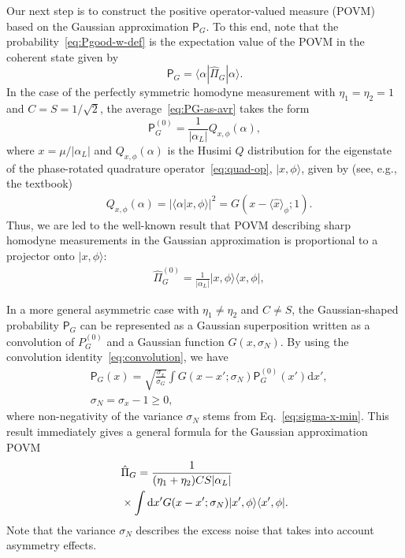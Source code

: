 \documentclass[%
reprint,
superscriptaddress,
 amsmath,amssymb,amsfonts,
 aps,
 pra,
 longbibliography
]{revtex4-2}
\newcommand{\ket}[1]{\ensuremath{|{#1}\rangle}}
\newcommand{\avr}[1]{\ensuremath{\langle{#1}\rangle}}
\newcommand{\prob}{\mathsf{P}}
\newcommand{\dd}{\mathrm{d}}
\begin{document}
Our next step is to construct
the positive operator-valued measure
(POVM) based on the Gaussian approximation $\prob_G$.
To this end, note that the probability~\eqref{eq:Pgood-w-def}
is the expectation value of the POVM in the coherent state
given by
\begin{equation}
  \label{eq:PG-as-avr}
    \prob_G=\langle\alpha|\hat{\Pi}_G|\alpha\rangle.
\end{equation}
In the case of
the perfectly symmetric homodyne measurement with
$\eta_1=\eta_2=1$ and $C=S=1/\sqrt{2}$,
the average~\eqref{eq:PG-as-avr}
takes the form
\begin{equation}
    \label{eq:P_0}
    \prob_G^{(0)}=
    \frac{1}{|\alpha_L|} Q_{x,\phi}(\alpha), 
  \end{equation}
  where
  $x=\mu/|\alpha_L|$
  and $Q_{x,\phi}(\alpha)$ is the Husimi $Q$ distribution
for the eigenstate of the phase-rotated quadrature
operator~\eqref{eq:quad-op},
$\ket{x,\phi}$, given by
(see, e.g., the textbook\cite{Vogel:bk:2006})
\begin{align}
  &
    \label{eq:Q-x}
  Q_{x,\phi}(\alpha)=
    |\langle \alpha|x , \phi \rangle |^2 =G(x-\avr{\hat{x}}_\phi;1).
\end{align}
Thus, we are led to the well-known result that POVM describing sharp homodyne measurements
in the Gaussian approximation is proportional to
a projector onto $|x,\phi\rangle$:
\begin{align}
  &
  \label{eq:POVM-P0}
    \hat{\Pi}_G^{(0)}=\frac{1}{|\alpha_L|}|x,\phi\rangle\langle x,\phi|,
\end{align}

In  a more general asymmetric case with $\eta_1\ne \eta_2$
and $C\ne S$,
the Gaussian-shaped probability $\prob_G$ can be represented
as a Gaussian superposition written as
a convolution of $P_{G}^{(0)}$ and a Gaussian function $G(x,\sigma_N)$.
By using the convolution identity~\eqref{eq:convolution},
we have
\begin{align}
  &
  \label{eq:theform}
  \prob_G(x)=\sqrt{\frac{\sigma_x}{\sigma_G}} \int G(x-x';\sigma_N)\prob_G^{(0)}(x')\dd x',
  \\
  &
  \label{eq:sgm_N}
     \sigma_N=\sigma_x-1\ge 0,  
\end{align}
where non-negativity of the variance $\sigma_N$
stems from Eq.~\eqref{eq:sigma-x-min}.
  This result immediately gives
  a general formula for the Gaussian approximation POVM 
\begin{align}
  &
\label{eq:homodyne-povm}    
    \hat{\Pi}_G=\frac{1}{(\eta_1+\eta_2)CS|\alpha_L|}
    \notag
  \\
  &
    \times
    \int \dd x' G(x-x'; \sigma_N)|x',\phi\rangle\langle x',\phi|.
\end{align}
Note that the variance $\sigma_N$
describes the excess noise that takes into account asymmetry effects.
\end{document}
